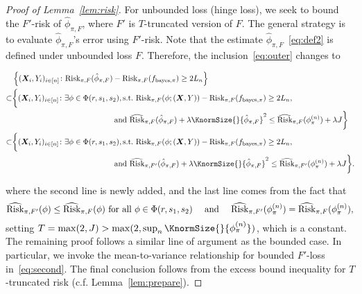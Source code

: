 \documentclass[11pt]{article}
\theoremstyle{plain}
\theoremstyle{definition}
\def\bayespif{f_{\textup{bayes},\pi}}
\def\riskF{\textup{Risk}_{\pi,F}}
\def\eriskF{\widehat{\textup{Risk}}_{\pi,F}}
\begin{document}
\begin{proof}[Proof of Lemma~\ref{lem:risk}]
For unbounded loss (hinge loss), we seek to bound the $F'$-risk of $\hat \phi_{\pi,F}$, where $F'$ is $T$-truncated version of $F$. The general strategy is to evaluate $\hat \phi_{\pi,F}$'s error using $F'$-risk.  Note that the estimate $\hat \phi_{\pi,F}$~\eqref{eq:def2} is defined under unbounded loss $F$. Therefore, the inclusion~\eqref{eq:outer} changes to

\begin{align}
&\left\{(\mX_i,Y_i)_{i\in[n]}\colon \riskF(\hat\phi_{\pi,F})-\riskF(\bayespif)\geq 2L_n \right\}\notag \\
 \subset &
 \bigg\{(\mX_i,Y_i)_{i\in[n]}\colon \exists \phi\in\Phi(r,s_1,s_2), \text{s.t.}\  \riskF(\phi; (\mX,Y))-\riskF(\bayespif)\geq 2L_n, \notag \\&\hspace*{4.6cm} \text{and}\  \eriskF(\hat\phi_{\pi,F})+\lambda\KnormSize{}{\hat \phi_{\pi,F}}^2\leq \eriskF(\phi_{\pi}^{(n)})+\lambda J \bigg\}\notag \\
 \subset &
 \bigg\{(\mX_i,Y_i)_{i\in[n]}\colon \exists \phi\in\Phi(r,s_1,s_2), \text{s.t.}\  \riskF(\phi; (\mX,Y))-\riskF(\bayespif)\geq 2L_n, \notag \\&\hspace*{4.6cm} \text{and}\  \widehat{\textup{Risk}}_{\pi,F'}(\hat\phi_{\pi,F})+\lambda\KnormSize{}{\hat \phi_{\pi,F}}^2\leq\widehat{\textup{Risk}}_{\pi,F'}(\phi_{\pi}^{(n)})+\lambda J \bigg\}
.
\end{align}



where the second line is newly added, and the last line comes from the fact that
\[
\widehat{\textup{Risk}}_{\pi,F'}(\phi)\leq \widehat{\textup{Risk}}_{\pi,F}(\phi) \text{ for all } \phi\in \Phi(r,s_1,s_2)\quad\text{ and } \quad \widehat{\textup{Risk}}_{\pi,F'}(\phi_\pi^{(n)})= \widehat{\textup{Risk}}_{\pi,F}(\phi_\pi^{(n)}), 
\]
setting $T= \max(2,J)>\max(2,\sup_n\KnormSize{}{\phi_{\pi}^{(n)}})$, which is a constant. The remaining proof follows a similar line of argument as the bounded case. In particular, we invoke the mean-to-variance relationship for bounded $F'$-loss in~\eqref{eq:second}. The final conclusion follows from the excess bound inequality for $T$-truncated risk (c.f. Lemma~\ref{lem:prepare}).
\end{proof}
\end{document}

